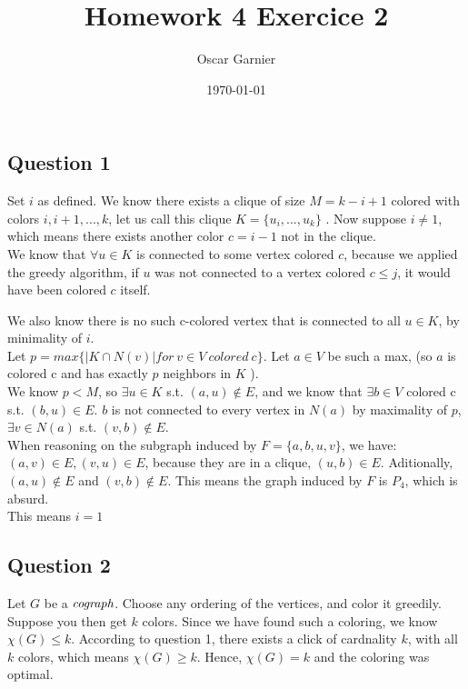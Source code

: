 \documentclass{scrartcl}
\title{Homework 4 Exercice 2}
\author{Oscar Garnier}
\date{\today}
\begin{document}
\newcommand{\E}[1]{\section*{Exo #1}}
\newcommand{\CR}[2]{\section*{#1 // note : #2}}
\newcommand{\Q}[1]{\section*{Exercise #1}}
\newcommand{\SQ}[1]{\subsection*{Question #1}}
\maketitle

\SQ{1}
Set \( i \) as defined. We know there exists a clique of size \( M = k - i + 1 \) colored with colors \( i, i+ 1, ..., k \), let us call this clique \( K = \{ u_i, ..., u_k \} \) . Now suppose \( i \neq 1 \), which means there exists another color \( c = i - 1\) not in the clique. \\

We know that \( \forall u \in K\) is connected to some vertex colored \( c \), because we applied the greedy algorithm, if \( u\) was not connected to a vertex colored \( c \leq j \), it would have been colored \( c \) itself. 

We also know there is no such c-colored vertex that is connected to all \(u \in K \), by minimality of \( i \). \\


Let \( p = max \{ |K \cap N(v)| for \ v \in V \ colored \ c \} \). Let \( a \in V \) be such a max, (so \( a \) is colored c and has exactly \( p \) neighbors in \( K \) ). \\
We know \( p < M \), so \( \exists u \in K \) s.t. \( (a,u) \not \in E \), and we know that \( \exists b \in V \) colored c s.t. \( (b,u) \in E\). \( b\) is not connected to every vertex in \( N(a) \) by maximality of \( p \), \( \exists v \in N(a) \) s.t. \( (v,b) \not \in E \). \\
When reasoning on the subgraph induced by \( F = \{a,b,u,v\} \), we have: \( (a,v) \in E, (v,u) \in E \), because they are in a clique, \( (u,b) \in E \). Aditionally, \( (a,u) \not \in E \) and \( (v,b) \not \in E \). This means the graph induced by \( F \) is \( P_4 \), which is absurd.\\
This means \( i = 1 \)

 
\SQ{2}
Let \( G \) be a \( \emph{cograph} \). Choose any ordering of the vertices, and color it greedily. Suppose you then get \( k \) colors. Since we have found such a coloring, we know \( \chi(G) \leq k \). According to question 1, there exists a click of cardnality \( k \), with all \( k \) colors, which means \( \chi(G) \geq k \). Hence, \( \chi(G) = k \) and the coloring was optimal.
\end{document}
